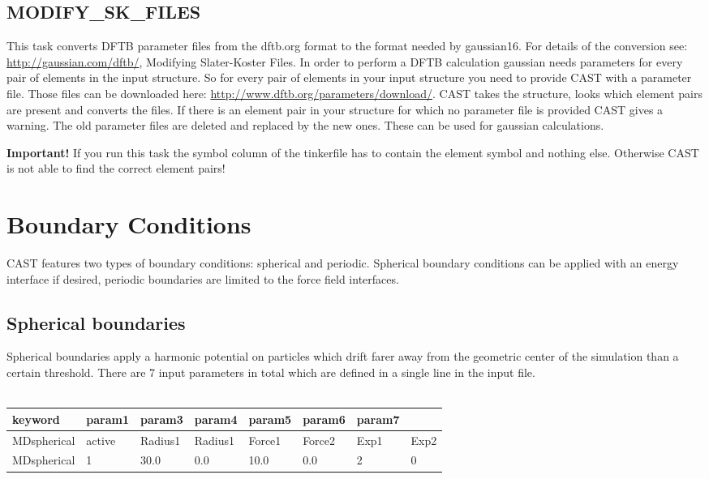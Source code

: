 \documentclass[10pt,a4paper]{article} %
\begin{document}
	\subsection{MODIFY\_SK\_FILES}
	This task converts DFTB parameter files from the dftb.org format to the format needed by gaussian16. For details of the conversion see: \url{http://gaussian.com/dftb/}, Modifying Slater-Koster Files. In order to perform a DFTB calculation gaussian needs parameters for every pair of elements in the input structure. So for every pair of elements in your input structure you need to provide CAST with a parameter file. Those files can be downloaded here: \url{http://www.dftb.org/parameters/download/}. CAST takes the structure, looks which element pairs are present and converts the files. If there is an element pair in your structure for which no parameter file is provided CAST gives a warning. The old parameter files are deleted and replaced by the new ones. These can be used for gaussian calculations.
	
\textbf{Important!} If you run this task the symbol column of the tinkerfile has to contain the element symbol and nothing else. Otherwise CAST is not able to find the correct element pairs!
		

	\section{Boundary Conditions}
	\label{sec:boundary}
	\ac{CAST} features two types of boundary conditions: spherical and periodic. Spherical boundary conditions can be applied with an energy interface if desired, periodic boundaries are limited to the force field interfaces.

	\subsection{Spherical boundaries}
	Spherical boundaries apply a harmonic potential on particles which drift farer away from the geometric center of the simulation than a certain threshold. There are 7 input parameters in total which are defined in a single line in the input file. \\~\\

	\begin{tabularx}{\textwidth}{l|X|X|X|X|X|X|X}
		keyword & param1 & param3 & param4 & param5 & param6 & param7 \\
		\hline
		MDspherical & active & Radius1 & Radius1 & Force1 & Force2 & Exp1 & Exp2 \\
		MDspherical & 1 & 30.0 & 0.0 & 10.0 & 0.0 & 2 & 0 \\
	\end{tabularx}~\\
\end{document}
